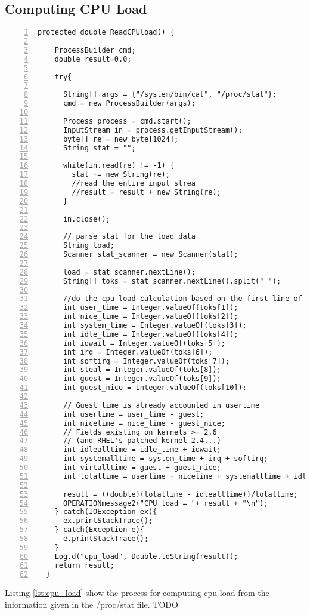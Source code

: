 \documentclass{article} %
\begin{document}
\subsection{Computing CPU Load}
\begin{lstlisting}[caption={Computing CPU Load},label={lst:cpu_load},numbers=left]
protected double ReadCPUload() {

    ProcessBuilder cmd;
    double result=0.0;

    try{

      String[] args = {"/system/bin/cat", "/proc/stat"};
      cmd = new ProcessBuilder(args);

      Process process = cmd.start();
      InputStream in = process.getInputStream();
      byte[] re = new byte[1024];
      String stat = "";

      while(in.read(re) != -1) {
        stat += new String(re);
        //read the entire input strea
        //result = result + new String(re);
      }

      in.close();

      // parse stat for the load data
      String load;
      Scanner stat_scanner = new Scanner(stat);

      load = stat_scanner.nextLine();
      String[] toks = stat_scanner.nextLine().split(" ");

      //do the cpu load calculation based on the first line of /proc/stat
      int user_time = Integer.valueOf(toks[1]);
      int nice_time = Integer.valueOf(toks[2]);
      int system_time = Integer.valueOf(toks[3]);
      int idle_time = Integer.valueOf(toks[4]);
      int iowait = Integer.valueOf(toks[5]);
      int irq = Integer.valueOf(toks[6]);
      int softirq = Integer.valueOf(toks[7]);
      int steal = Integer.valueOf(toks[8]);
      int guest = Integer.valueOf(toks[9]);
      int guest_nice = Integer.valueOf(toks[10]);

      // Guest time is already accounted in usertime
      int usertime = user_time - guest;
      int nicetime = nice_time - guest_nice;
      // Fields existing on kernels >= 2.6
      // (and RHEL's patched kernel 2.4...)
      int idlealltime = idle_time + iowait;
      int systemalltime = system_time + irq + softirq;
      int virtalltime = guest + guest_nice;
      int totaltime = usertime + nicetime + systemalltime + idlealltime + steal + virtalltime;

      result = ((double)(totaltime - idlealltime))/totaltime;
      OPERATIONmessage2("CPU load = "+ result + "\n");
    } catch(IOException ex){
      ex.printStackTrace();
    } catch(Exception e){
      e.printStackTrace();
    }
    Log.d("cpu_load", Double.toString(result));
    return result;
  }
\end{lstlisting}
Listing \ref{lst:cpu_load} show the process for computing cpu load from the information given in the /proc/stat file.
TODO
\end{document}
